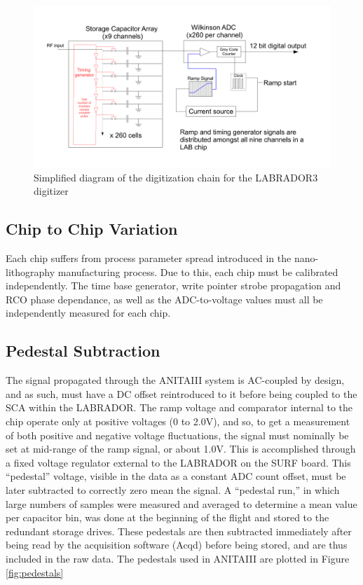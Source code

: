 \begin{figure}
	\includegraphics[width=\textwidth]{figures/LAB_Digitization}
	\caption{Simplified diagram of the digitization chain for the LABRADOR3 digitizer}
	\label{fig:Lab_Digitization}
\end{figure}	
		
	\subsection{Chip to Chip Variation}
		Each chip suffers from process parameter spread introduced in the nano-lithography manufacturing process.  Due to this, each chip must be calibrated independently.  The time base generator, write pointer strobe propagation and RCO phase dependance, as well as the ADC-to-voltage values must all be independently measured for each chip. 

	\subsection{Pedestal Subtraction}
		The signal propagated through the ANITAIII system is AC-coupled by design, and as such, must have a DC offset reintroduced to it before being coupled to the SCA within the LABRADOR.  The ramp voltage and comparator internal to the chip operate only at positive voltages (0 to 2.0V), and so, to get a measurement of both positive and negative voltage fluctuations, the signal must nominally be set at mid-range of the ramp signal, or about 1.0V.  This is accomplished through a fixed voltage regulator external to the LABRADOR on the SURF board.  This ``pedestal'' voltage, visible in the data as a constant ADC count offset, must be later subtracted to correctly zero mean the signal.  A ``pedestal run,'' in which large numbers of samples were measured and averaged to determine a mean value per capacitor bin, was done at the beginning of the flight and stored to the redundant storage drives.  These pedestals are then subtracted immediately after being read by the acquisition software (Acqd) before being stored, and are thus included in the raw data.  The pedestals used in ANITAIII are plotted in Figure \ref{fig:pedestals}
		
